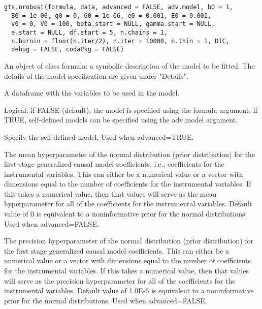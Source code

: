 \documentclass[a4paper]{book}
\begin{document}
%
\begin{Usage}
\begin{verbatim}
gts.nrobust(formula, data, advanced = FALSE, adv.model, b0 = 1,
  B0 = 1e-06, g0 = 0, G0 = 1e-06, e0 = 0.001, E0 = 0.001,
  v0 = 0, V0 = 100, beta.start = NULL, gamma.start = NULL,
  e.start = NULL, df.start = 5, n.chains = 1,
  n.burnin = floor(n.iter/2), n.iter = 10000, n.thin = 1, DIC,
  debug = FALSE, codaPkg = FALSE)
\end{verbatim}
\end{Usage}
%
\begin{Arguments}
\begin{ldescription}
\item[\code{formula}] An object of class formula: a symbolic description of the model to be fitted.
The details of the model specification are given under "Details".

\item[\code{data}] A dataframe with the variables to be used in the model.

\item[\code{advanced}] Logical; if FALSE (default), the model is specified using the formula argument,
if TRUE, self-defined models can be specified using the adv.model argument.

\item[\code{adv.model}] Specify the self-defined model. Used when advanced=TRUE.

\item[\code{b0}] The mean hyperparameter of the normal distribution (prior distribution)
for the first-stage generalized causal model coefficients, i.e., coefficients for the instrumental variables.
This can either be a numerical value or a vector with dimensions equal to the number of coefficients
for the instrumental variables. If this takes a numerical value, then that values will
serve as the mean hyperparameter for all of the coefficients for the instrumental variables.
Default value of 0 is equivalent to a noninformative prior for the normal distributions.
Used when advanced=FALSE.

\item[\code{B0}] The precision hyperparameter of the normal distribution (prior distribution)
for the first stage generalized causal model coefficients.
This can either be a numerical value or a vector with dimensions equal to the number of coefficients
for the instrumental variables. If this takes a numerical value, then that values will
serve as the precision hyperparameter for all of the coefficients for the instrumental variables.
Default value of 1.0E-6 is equivalent to a noninformative prior for the normal distributions.
Used when advanced=FALSE.


\end{ldescription}
\end{Arguments}
\end{document}
